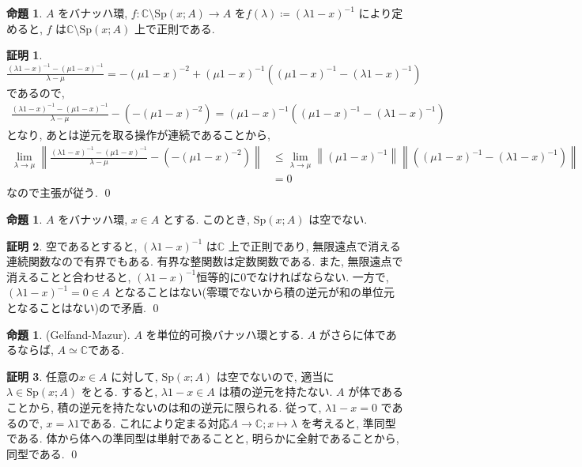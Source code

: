 \documentclass[10pt, fleqn, label-section=none]{bxjsarticle}
\theoremstyle{definition}
\newtheorem{prop}[dfn]{命題}
\newtheorem*{pf*}{証明}
\newcommand{\norm}[1]{\left\|#1\right\|}
\renewcommand{\;}{\, ; \,}
\begin{document}
\begin{prop}$A$ をバナッハ環, $f : \mathbb C \setminus \textrm{Sp}(x ; A) \rightarrow A$ を$f(\lambda) \coloneqq (\lambda 1 - x)^{-1} $  により定めると, $f$ は$ \mathbb C \setminus \textrm{Sp}(x ; A)$ 上で正則である. 
\end{prop}
\begin{pf*}
$ \frac{ (\lambda 1 - x)^{-1} - (\mu1 - x)^{-1}   }{\lambda - \mu} = - (\mu1 - x)^{-2} + (\mu1 - x)^{-1}  ((\mu1 - x)^{-1}  - (\lambda 1 - x)^{-1} ) $ であるので, 
\begin{align*} \frac{ (\lambda 1 - x)^{-1} - (\mu1 - x)^{-1}   }{\lambda - \mu} - ( - (\mu1 - x)^{-2} ) =  (\mu1 - x)^{-1}  ((\mu1 - x)^{-1}  - (\lambda 1 - x)^{-1} ) \end{align*}
となり, あとは逆元を取る操作が連続であることから,
\begin{align*} \lim_{\lambda \rightarrow \mu }  \norm {\frac{ (\lambda 1 - x)^{-1} - (\mu1 - x)^{-1}   }{\lambda - \mu} - ( - (\mu1 - x)^{-2} )  } &\leq \lim_{\lambda \rightarrow \mu } \norm{ (\mu1 - x)^{-1} } \norm{ ((\mu1 - x)^{-1}  - (\lambda 1 - x)^{-1} ) }  \\& = 0 \end{align*} 
なので主張が従う. 
\qed
\end{pf*}



\begin{prop}
$A$ をバナッハ環, $x \in A$ とする. このとき, 
$\textrm{Sp}(x ; A)$ は空でない.  
\end{prop}
\begin{pf*}
空であるとすると, $(\lambda 1 - x) ^{-1}$ は$\mathbb C$ 上で正則であり, 無限遠点で消える連続関数なので有界でもある. 有界な整関数は定数関数である. また, 無限遠点で消えることと合わせると, $(\lambda 1 - x) ^{-1}$恒等的に$0$でなければならない. 一方で, 
$(\lambda 1 - x) ^{-1} = 0 \in A$ となることはない(零環でないから積の逆元が和の単位元となることはない)ので矛盾. 
\qed
\end{pf*}

\begin{prop}(Gelfand-Mazur). 
$A$ を単位的可換バナッハ環とする. $A$ がさらに体であるならば, $A \simeq \mathbb C$である. 
\end{prop}
\begin{pf*}
任意の$x \in A$ に対して,  $\textrm{Sp} (x ;A)$ は空でないので, 適当に$\lambda \in \textrm{Sp} (x ;A)$  をとる. すると, $\lambda 1 - x  \in A$ は積の逆元を持たない. $A$ が体であることから, 積の逆元を持たないのは和の逆元に限られる. 従って, $\lambda 1 - x = 0$ であるので, $x = \lambda 1$である. これにより定まる対応$A \rightarrow \mathbb C; x \mapsto \lambda$ を考えると, 準同型である. 体から体への準同型は単射であることと, 明らかに全射であることから, 同型である. 
\qed
\end{pf*}
\end{document}

